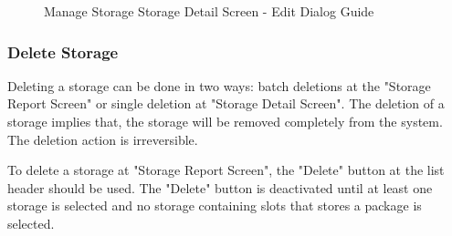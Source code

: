 \begin{figure}[H]
	\centering
    \vspace{5pt}
    \vspace{5pt}
    
    \caption{Manage Storage Storage Detail Screen - Edit Dialog Guide}
	\label{fig:MSDetailEditBtn}
\end{figure}

\subsubsection{Delete Storage}

Deleting a storage can be done in two ways: batch deletions at the "Storage Report Screen" or single deletion at "Storage Detail Screen". 
The deletion of a storage implies that, the storage will be removed completely from the system. The deletion action is irreversible. 

To delete a storage at "Storage Report Screen", the "Delete" button at the list header should be used. The "Delete" button is deactivated until at least one storage is selected and no storage containing slots that stores a package is selected.

